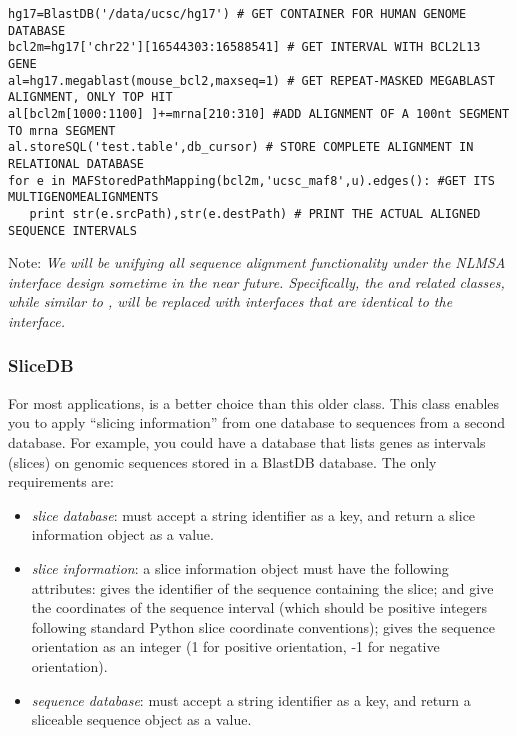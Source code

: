 \documentclass{howto}
\begin{document}
\begin{verbatim}
hg17=BlastDB('/data/ucsc/hg17') # GET CONTAINER FOR HUMAN GENOME DATABASE
bcl2m=hg17['chr22'][16544303:16588541] # GET INTERVAL WITH BCL2L13 GENE
al=hg17.megablast(mouse_bcl2,maxseq=1) # GET REPEAT-MASKED MEGABLAST ALIGNMENT, ONLY TOP HIT
al[bcl2m[1000:1100] ]+=mrna[210:310] #ADD ALIGNMENT OF A 100nt SEGMENT TO mrna SEGMENT
al.storeSQL('test.table',db_cursor) # STORE COMPLETE ALIGNMENT IN RELATIONAL DATABASE
for e in MAFStoredPathMapping(bcl2m,'ucsc_maf8',u).edges(): #GET ITS MULTIGENOMEALIGNMENTS
   print str(e.srcPath),str(e.destPath) # PRINT THE ACTUAL ALIGNED SEQUENCE INTERVALS
\end{verbatim}

Note: {\em We will be unifying all sequence alignment functionality under the 
NLMSA interface design sometime in the near future.  Specifically, the
 and related classes, while similar to ,
will be replaced with interfaces that are identical to the 
interface.}

\subsubsection{SliceDB}
For most applications,  is a better choice than
this older class.
This class enables you to apply ``slicing information'' from 
one database to sequences from a second database.  For example,
you could have a database that lists genes as intervals (slices)
on genomic sequences stored in a BlastDB database.  The only
requirements are:
\begin{itemize}
\item
{\em slice database}: must accept a string identifier as a key,
and return a slice information object as a value.

\item
{\em slice information}: a slice information object must
have the following attributes:  gives the identifier
of the sequence containing the slice;  and 
give the coordinates of the sequence interval (which should be positive
integers following standard
Python slice coordinate conventions);  gives the sequence
orientation as an integer (1 for positive orientation, -1 for
negative orientation).

\item
{\em sequence database}: must accept a string identifier as a key,
and return a sliceable sequence object as a value.

\end{itemize}
\end{document}

